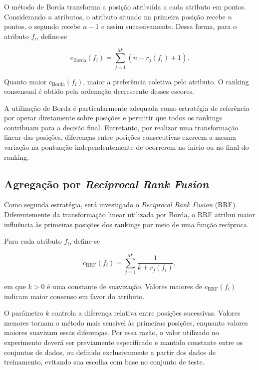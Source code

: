 O método de Borda transforma a posição atribuída a cada atributo em pontos.
Considerando $n$ atributos, o atributo situado na primeira posição recebe
$n$ pontos, o segundo recebe $n-1$ e assim sucessivamente. Dessa forma, para
o atributo $f_i$, define-se

\begin{equation}
    c_{\mathrm{Borda}}(f_i)
    =
    \sum_{j=1}^{M'}
    \left(
        n-r_j(f_i)+1
    \right).
    \label{eq:borda-ac-efs}
\end{equation}

Quanto maior $c_{\mathrm{Borda}}(f_i)$, maior a preferência coletiva pelo
atributo. O ranking consensual é obtido pela ordenação decrescente desses
escores.

A utilização de Borda é particularmente adequada como estratégia de referência
por operar diretamente sobre posições e permitir que todos os rankings
contribuam para a decisão final. Entretanto, por realizar uma transformação
linear das posições, diferenças entre posições consecutivas exercem a mesma
variação na pontuação independentemente de ocorrerem no início ou no final do
ranking.


\subsection{Agregação por \textit{Reciprocal Rank Fusion}}
\label{subsec:ac-efs-rrf}

Como segunda estratégia, será investigado o \textit{Reciprocal Rank Fusion}
(RRF). Diferentemente da transformação linear utilizada por Borda, o RRF
atribui maior influência às primeiras posições dos rankings por meio de uma
função recíproca.

Para cada atributo $f_i$, define-se

\begin{equation}
    c_{\mathrm{RRF}}(f_i)
    =
    \sum_{j=1}^{M'}
    \frac{1}{k+r_j(f_i)},
    \label{eq:rrf-ac-efs}
\end{equation}

em que $k>0$ é uma constante de suavização. Valores maiores de
$c_{\mathrm{RRF}}(f_i)$ indicam maior consenso em favor do atributo.

O parâmetro $k$ controla a diferença relativa entre posições sucessivas.
Valores menores tornam o método mais sensível às primeiras posições, enquanto
valores maiores suavizam essas diferenças. Por essa razão, o valor utilizado
no experimento deverá ser previamente especificado e mantido constante entre
os conjuntos de dados, ou definido exclusivamente a partir dos dados de
treinamento, evitando sua escolha com base no conjunto de teste.



